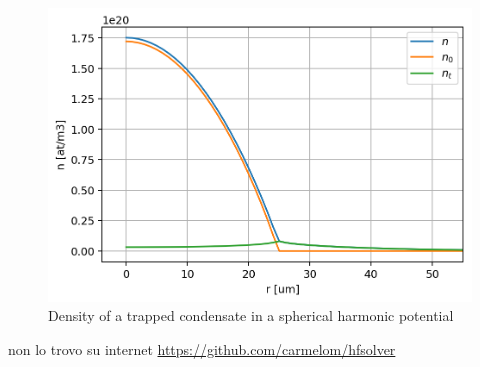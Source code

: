 \documentclass{article}
\begin{document}
\begin{figure}
  \centering
  \includegraphics[width=\textwidth]{figures/fig_harmonic_trap}
  \caption{Density of a trapped condensate in a spherical harmonic potential}
  \label{fig:harmonic_trap}
\end{figure}

\begin{thebibliography}{}
\pagestyle{headings}
 non lo trovo su internet
 \url{https://github.com/carmelom/hfsolver}
\end{thebibliography}
\end{document}
